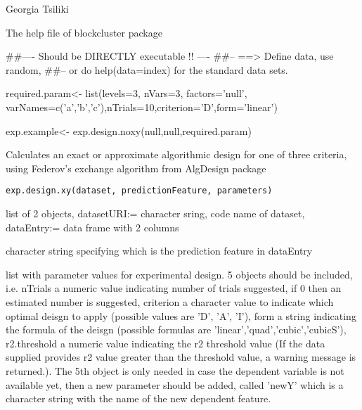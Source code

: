 \documentclass[letterpaper]{book}
\begin{document}
%
\begin{Author}\relax
Georgia Tsiliki
\end{Author}
%
\begin{References}\relax
The help file of blockcluster package 
\end{References}
%
\begin{Examples}
\begin{ExampleCode}
##---- Should be DIRECTLY executable !! ----
##-- ==>  Define data, use random,
##--	or do  help(data=index)  for the standard data sets.


required.param<-  list(levels=3, nVars=3, factors='null', varNames=c('a','b','c'),nTrials=10,criterion='D',form='linear')


exp.example<- exp.design.noxy(null,null,required.param) 
\end{ExampleCode}
\end{Examples}
%
\begin{Description}\relax
Calculates an exact or approximate algorithmic design for one of three criteria, using Federov's exchange algorithm from AlgDesign package
\end{Description}
%
\begin{Usage}
\begin{verbatim}
exp.design.xy(dataset, predictionFeature, parameters)
\end{verbatim}
\end{Usage}
%
\begin{Arguments}
\begin{ldescription}
\item[\code{dataset}] list of 2 objects, datasetURI:= character sring, code name of dataset, dataEntry:= data frame with 2 columns 

\item[\code{predictionFeature}]  character string specifying which is the prediction feature in dataEntry 

\item[\code{parameters}] list with parameter values for experimental design. 5 objects should be included, i.e. nTrials a numeric value indicating number of trials suggested, if 0 then an estimated number is suggested, criterion a character value to indicate which optimal deisgn to apply (possible values are  'D', 'A', 'I'), form a string indicating the formula of the deisgn (possible formulas are 'linear','quad','cubic','cubicS'), r2.threshold a numeric value indicating the r2 threshold value (If the data supplied provides
r2 value greater than the threshold value, a warning message is returned.). The 5th object is only needed in case the dependent variable is not available yet, then a new parameter should be added, called 'newY' which is a character string with the name of the new dependent feature.

\end{ldescription}
\end{Arguments}
\end{document}
